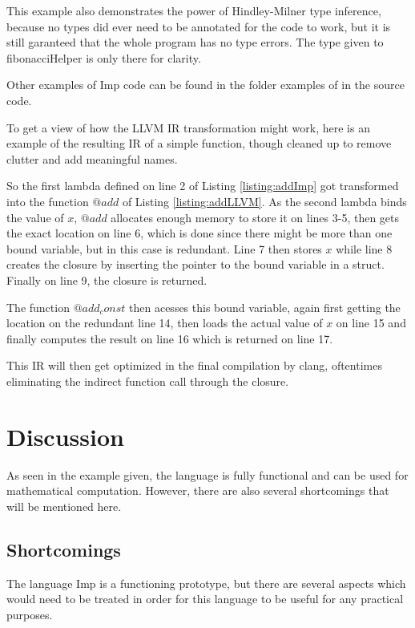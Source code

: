 \documentclass[12pt]{article}
\begin{document}
This example also demonstrates the power of Hindley-Milner type inference,
because no types did ever need to be annotated for the code to work,
but it is still garanteed that the whole program has no type errors.
The type given to fibonacciHelper is only there for clarity.

Other examples of Imp code can be found in the folder examples of
in the source code.

To get a view of how the LLVM IR transformation might work, here is
an example of the resulting IR of a simple function,
though cleaned up to remove clutter and add meaningful names.

\begin{minipage}{\linewidth}
	
	
\end{minipage}

So the first lambda defined on line 2 of Listing \ref{listing:addImp} got transformed
into the function $@add$ of Listing \ref{listing:addLLVM}.
As the second lambda binds the value of $x$, $@add$ allocates
enough memory to store it on lines 3-5, then gets the exact location on line 6, which
is done since there might be more than one bound variable, but in this case is redundant.
Line 7 then stores $x$ while line 8 creates the closure by inserting the pointer to the bound
variable in a struct.
Finally on line 9, the closure is returned.

The function $@add_const$ then acesses this bound variable, again first getting the
location on the redundant line 14, then loads the actual value of $x$ on line 15
and finally computes the result on line 16 which is returned on line 17.

This IR will then get optimized in the final compilation by clang,
oftentimes eliminating the indirect function call through the closure.
\section{Discussion}
As seen in the example given, the language is fully functional and
can be used for mathematical computation. However, there are also several
shortcomings that will be mentioned here.

\subsection{Shortcomings}\label{shortcomings}
The language Imp is a functioning prototype, but there are several
aspects which would need to be treated in order for this language
to be useful for any practical purposes.
\end{document}
